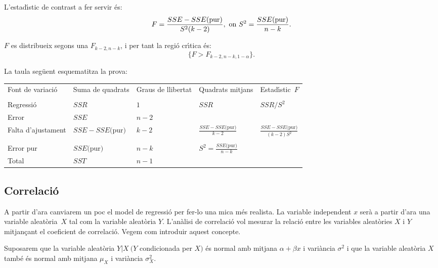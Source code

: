 L'estad\'{\i}stic de contrast a fer servir \'es:
$$F = {SSE - SSE({\rm pur}) \over S^2 (k-2)}, \ \mbox{on } S^2 = {SSE({\rm pur})
\over n-k}.$$

$F$ es distribueix segons una $F_{k-2,n-k}$, i per tant la regi\'o 
cr\'{\i}tica \'es:
$$\{ F > F_{k-2,n-k,1-\alpha} \}.$$

La taula seg\"uent esquematitza la prova:
\begin{center}
\begin{tabular}{|l@{}l@{}l@{}l@{}l|}
\multicolumn{1}{l}{\multirow{1}{2cm}{Font de variaci\'o}}&
\multirow{1}{2cm}{Suma de quadrats}&
\multirow{1}{2cm}{Graus de llibertat}&\multirow{1}{2cm}{Quadrats mitjans}&
\multicolumn{1}{l}{\multirow{1}{2cm}{Estad\'{\i}stic~$F$}}\\
\multicolumn{1}{l}{}&&&&\multicolumn{1}{l}{}\\\hline
Regressi\'o&$SSR$&$1$&$SSR$&$SSR/S^2$\\
Error&$SSE$&$n-2$&&\\
\multirow{1}{2cm}{Falta d'ajustament}&$SSE -SSE \mbox{(pur)}$&$k-2$&
$\frac{SSE -SSE \mbox{(pur)}}{k-2}$&
$\frac{SSE -SSE \mbox{(pur)}}{(k-2) S^2}$\\ &&&&\\
Error pur&$SSE \mbox{(pur)}$&$n-k$&$S^2=\frac{SSE \mbox{(pur)}}{n-k}$&\\
Total&$SST$&$n-1$&&\\\hline
\end{tabular}
\end{center}

\subsection{Correlaci\'o}

A partir d'ara canviarem un poc el model de regressi\'o per fer-lo una mica m\'es
realista. La variable independent $x$ ser\`a a partir d'ara una variable 
aleat\`oria~$X$ tal com la variable aleat\`oria $Y$. L'an\`alisi de correlaci\'o 
vol mesurar la
relaci\'o entre les variables aleat\`ories $X$ i $Y$ mitjan\c cant el coeficient de
correlaci\'o. Vegem com introduir aquest concepte.

Suposarem que la variable aleat\`oria $Y|X \ (Y$ condicionada per $X)$ \'es normal
amb mitjana $\alpha + \beta x$ i vari\`ancia $\sigma^2$ i que la variable aleat\`oria
$X$ tamb\'e \'es normal amb mitjana $\mu_X$ i vari\`ancia $\sigma_X^2$.


